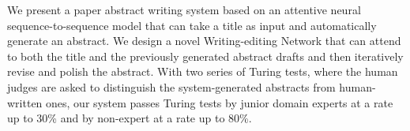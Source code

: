 We present a paper abstract writing system based on an attentive neural sequence-to-sequence model that can take a title as input and automatically generate an abstract. We design a novel Writing-editing Network that can attend to both the title and the previously generated abstract drafts and then iteratively revise and polish the abstract. With two series of Turing tests, where the human judges are asked to distinguish the system-generated abstracts from human-written ones, our system passes Turing tests by junior domain experts at a rate up to 30\% and by non-expert at a rate up to 80\%.

